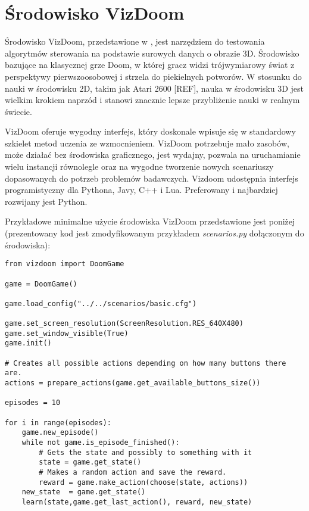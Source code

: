 \section{Środowisko VizDoom}

Środowisko VizDoom, przedstawione w \cite{DBLP:journals/corr/KempkaWRTJ16}, jest narzędziem do testowania algorytmów sterowania na podstawie surowych danych o obrazie 3D. Środowisko bazujące na klasycznej grze Doom, w której gracz widzi trójwymiarowy świat z perspektywy pierwszoosobowej i strzela do piekielnych potworów. W stosunku do nauki w środowisku 2D, takim jak Atari 2600 [REF], nauka w środowisku  3D jest wielkim krokiem naprzód i stanowi znacznie lepsze przybliżenie nauki w realnym świecie.

VizDoom oferuje wygodny interfejs, który doskonale wpisuje się w standardowy szkielet metod uczenia ze wzmocnieniem. VizDoom potrzebuje mało zasobów, może działać bez środowiska graficznego, jest wydajny, pozwala na uruchamianie wielu instancji równolegle oraz na wygodne tworzenie nowych scenariuszy dopasowanych do potrzeb problemów badawczych. Vizdoom udostępnia interfejs programistyczny dla Pythona, Javy, C++ i Lua. Preferowany i najbardziej rozwijany jest Python.

Przykładowe minimalne użycie środowiska VizDoom przedstawione jest poniżej (prezentowany kod jest zmodyfikowanym przykładem \textit{scenarios.py} dołączonym do środowiska):

\begin{lstlisting}[language=iPython]
from vizdoom import DoomGame

game = DoomGame()

game.load_config("../../scenarios/basic.cfg")

game.set_screen_resolution(ScreenResolution.RES_640X480)
game.set_window_visible(True)
game.init()

# Creates all possible actions depending on how many buttons there are.
actions = prepare_actions(game.get_available_buttons_size())

episodes = 10

for i in range(episodes):
    game.new_episode()
    while not game.is_episode_finished():
        # Gets the state and possibly to something with it
        state = game.get_state()
        # Makes a random action and save the reward.
        reward = game.make_action(choose(state, actions))
	new_state  = game.get_state() 
	learn(state,game.get_last_action(), reward, new_state)
\end{lstlisting}
